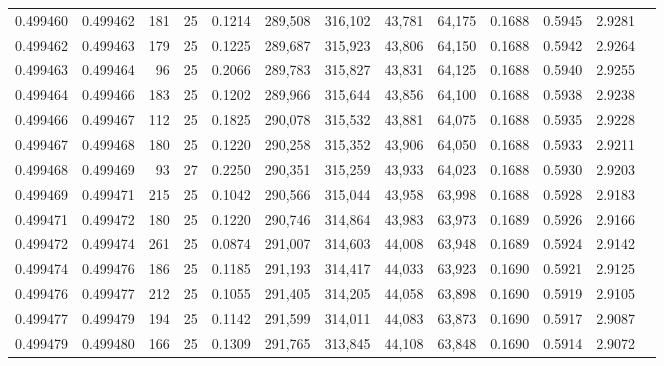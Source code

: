 \begin{tabular}{rrrrrrrrrrrrr}
0.499460 & 0.499462 & 181 &  25 &                                     0.1214 & 289,508 & 316,102 &  43,781 &  64,175 & 0.1688 & 0.5945 & 2.9281 \\
0.499462 & 0.499463 & 179 &  25 &                                     0.1225 & 289,687 & 315,923 &  43,806 &  64,150 & 0.1688 & 0.5942 & 2.9264 \\
0.499463 & 0.499464 &  96 &  25 &                                     0.2066 & 289,783 & 315,827 &  43,831 &  64,125 & 0.1688 & 0.5940 & 2.9255 \\
0.499464 & 0.499466 & 183 &  25 &                                     0.1202 & 289,966 & 315,644 &  43,856 &  64,100 & 0.1688 & 0.5938 & 2.9238 \\
0.499466 & 0.499467 & 112 &  25 &                                     0.1825 & 290,078 & 315,532 &  43,881 &  64,075 & 0.1688 & 0.5935 & 2.9228 \\
0.499467 & 0.499468 & 180 &  25 &                                     0.1220 & 290,258 & 315,352 &  43,906 &  64,050 & 0.1688 & 0.5933 & 2.9211 \\
0.499468 & 0.499469 &  93 &  27 &                                     0.2250 & 290,351 & 315,259 &  43,933 &  64,023 & 0.1688 & 0.5930 & 2.9203 \\
0.499469 & 0.499471 & 215 &  25 &                                     0.1042 & 290,566 & 315,044 &  43,958 &  63,998 & 0.1688 & 0.5928 & 2.9183 \\
0.499471 & 0.499472 & 180 &  25 &                                     0.1220 & 290,746 & 314,864 &  43,983 &  63,973 & 0.1689 & 0.5926 & 2.9166 \\
0.499472 & 0.499474 & 261 &  25 &                                     0.0874 & 291,007 & 314,603 &  44,008 &  63,948 & 0.1689 & 0.5924 & 2.9142 \\
0.499474 & 0.499476 & 186 &  25 &                                     0.1185 & 291,193 & 314,417 &  44,033 &  63,923 & 0.1690 & 0.5921 & 2.9125 \\
0.499476 & 0.499477 & 212 &  25 &                                     0.1055 & 291,405 & 314,205 &  44,058 &  63,898 & 0.1690 & 0.5919 & 2.9105 \\
0.499477 & 0.499479 & 194 &  25 &                                     0.1142 & 291,599 & 314,011 &  44,083 &  63,873 & 0.1690 & 0.5917 & 2.9087 \\
0.499479 & 0.499480 & 166 &  25 &                                     0.1309 & 291,765 & 313,845 &  44,108 &  63,848 & 0.1690 & 0.5914 & 2.9072 \\

\end{tabular}
